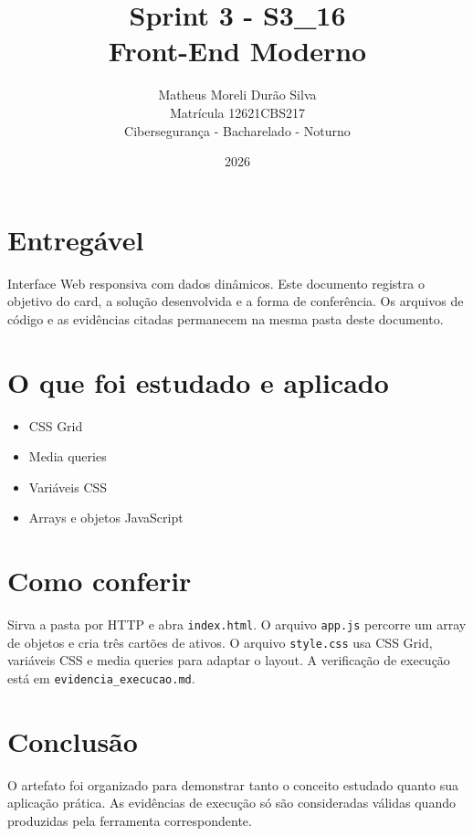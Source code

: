 \documentclass[12pt]{article}
\title{Sprint 3 - S3\_16\\Front-End Moderno}
\author{Matheus Moreli Durão Silva\\Matrícula 12621CBS217\\Cibersegurança - Bacharelado - Noturno}
\date{2026}
\begin{document}
\maketitle

\section*{Entregável}
Interface Web responsiva com dados dinâmicos. Este documento registra o objetivo do card, a solução desenvolvida e a forma de conferência. Os arquivos de código e as evidências citadas permanecem na mesma pasta deste documento.

\section*{O que foi estudado e aplicado}
\begin{itemize}
\item CSS Grid
\item Media queries
\item Variáveis CSS
\item Arrays e objetos JavaScript
\end{itemize}

\section*{Como conferir}
Sirva a pasta por HTTP e abra \texttt{index.html}. O arquivo \texttt{app.js} percorre um array de objetos e cria três cartões de ativos. O arquivo \texttt{style.css} usa CSS Grid, variáveis CSS e media queries para adaptar o layout. A verificação de execução está em \texttt{evidencia\_execucao.md}.

\section*{Conclusão}
O artefato foi organizado para demonstrar tanto o conceito estudado quanto sua aplicação prática. As evidências de execução só são consideradas válidas quando produzidas pela ferramenta correspondente.
\end{document}

